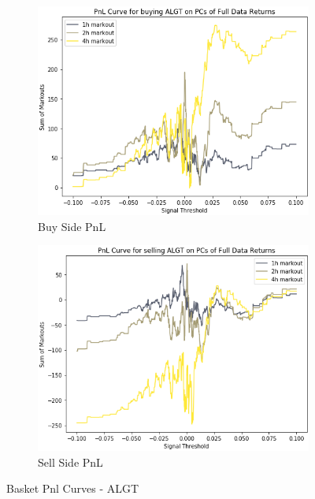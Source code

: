 \documentclass{article}
\begin{document}
\begin{figure}[h!]
  \centering
  \begin{subfigure}{.5\textwidth}
    \centering
    \includegraphics[width=.95\linewidth]{../Figures/basket_Pnl_Curve_buy_ALGT.png}
    \caption{Buy Side PnL}
  \end{subfigure}%
  \begin{subfigure}{.5\textwidth}
    \centering
    \includegraphics[width=.95\linewidth]{../Figures/basket_Pnl_Curve_sell_ALGT.png}
    \caption{Sell Side PnL}
  \end{subfigure}
  \caption{Basket Pnl Curves - ALGT}
\end{figure}

\newpage
\end{document}
